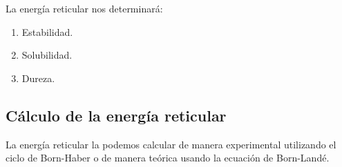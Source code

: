 La energía reticular nos determinará:
\begin{enumerate}[label=\letraminuscula]
        \item Estabilidad.
        \item Solubilidad.
        \item Dureza.
\end{enumerate}

\subsection{Cálculo de la energía reticular}\label{subsec:calculo-de-la-energia-reticular}

La energía reticular la podemos calcular de manera experimental utilizando el ciclo de Born-Haber o de manera teórica usando la ecuación de Born-Landé.

